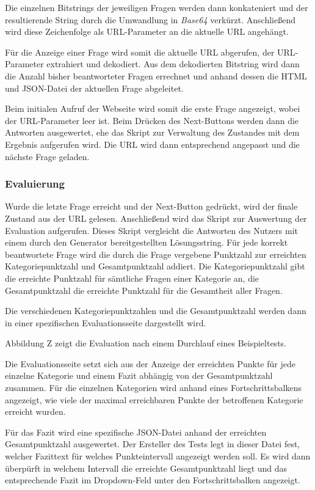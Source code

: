 Die einzelnen Bitstrings der jeweiligen Fragen werden dann konkateniert und der resultierende String durch die Umwandlung in \textit{Base64} verkürzt. 
Anschließend wird diese Zeichenfolge als URL-Parameter an die aktuelle URL angehängt.
 
Für die Anzeige einer Frage wird somit die aktuelle URL abgerufen, der URL-Parameter extrahiert und dekodiert.
Aus dem dekodierten Bitstring wird dann die Anzahl bisher beantworteter Fragen errechnet und anhand dessen die HTML und JSON-Datei der aktuellen Frage abgeleitet.

Beim initialen Aufruf der Webseite wird somit die erste Frage angezeigt, wobei der URL-Parameter leer ist.
Beim Drücken des Next-Buttons werden dann die Antworten ausgewertet, ehe das Skript zur Verwaltung des Zustandes mit dem Ergebnis aufgerufen wird. 
Die URL wird dann entsprechend angepasst und die nächste Frage geladen.

\subsubsection{Evaluierung}

Wurde die letzte Frage erreicht und der Next-Button gedrückt, wird der finale Zustand aus der URL gelesen.
Anschließend wird das Skript zur Auswertung der Evaluation aufgerufen. 
Dieses Skript vergleicht die Antworten des Nutzers mit einem durch den Generator bereitgestellten Lösungsstring.
Für jede korrekt beantwortete Frage wird die durch die Frage vergebene Punktzahl zur erreichten Kategoriepunktzahl und Gesamtpunktzahl addiert.
Die Kategoriepunktzahl gibt die erreichte Punktzahl für sämtliche Fragen einer Kategorie an, die Gesamtpunktzahl die erreichte Punktzahl für die Gesamtheit aller Fragen.

Die verschiedenen Kategoriepunktzahlen und die Gesamtpunktzahl werden dann in einer spezifischen Evaluationsseite dargestellt wird.
 
Abbildung Z zeigt die Evaluation nach einem Durchlauf eines Beispieltests. 

Die Evaluationsseite setzt sich aus der Anzeige der erreichten Punkte für jede einzelne Kategorie und einem Fazit abhängig von der Gesamtpunktzahl zusammen.
Für die einzelnen Kategorien wird anhand eines Fortschrittsbalkens angezeigt, wie viele der maximal erreichbaren Punkte der betroffenen Kategorie erreicht wurden. 

Für das Fazit wird eine spezifische JSON-Datei anhand der erreichten Gesamtpunktzahl ausgewertet. 
Der Ersteller des Tests legt in dieser Datei fest, welcher Fazittext für welches Punkteintervall angezeigt werden soll. 
Es wird dann überpürft in welchem Intervall die erreichte Gesamtpunktzahl liegt und das entsprechende Fazit im Dropdown-Feld unter den Fortschrittsbalken angezeigt. 
